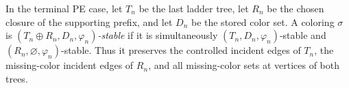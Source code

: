 \begin{definition}
In the terminal PE case, let $T_n$ be the last ladder tree, let $R_n$ be
the chosen closure of the supporting prefix, and let $D_n$ be the stored
color set.  A coloring $\sigma$ is
\emph{$(T_n\oplus R_n,D_n,\varphi_n)$-stable} if it is simultaneously
$(T_n,D_n,\varphi_n)$-stable and
$(R_n,\varnothing,\varphi_n)$-stable.  Thus it preserves the controlled
incident edges of $T_n$, the missing-color incident edges of $R_n$, and
all missing-color sets at vertices of both trees.
\end{definition}

